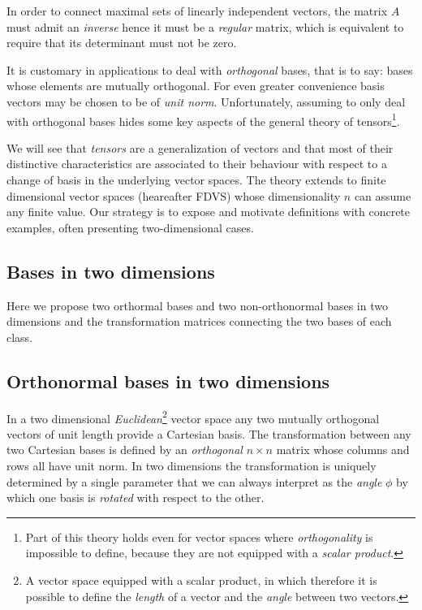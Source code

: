In order to connect maximal sets of linearly independent vectors, the matrix $A$ must admit an \textit{inverse} hence it must be a \textit{regular} matrix, which is equivalent to require that its determinant must not be zero. 

It is customary in applications to deal with \textit{orthogonal} bases, that is to say: bases whose elements are mutually orthogonal. For even greater convenience basis vectors may be chosen to be of \textit{unit norm}. 
Unfortunately, assuming to only deal with orthogonal bases hides some key aspects of the general theory of tensors\footnote{Part of this theory holds even for vector spaces where \textit{orthogonality} is impossible to define, because they are not equipped with a \textit{scalar product}.}.   

We will see that \textit{tensors} are a generalization of vectors and that most of their distinctive characteristics are associated to their behaviour with respect to a change of basis in the underlying vector spaces. The theory extends to finite dimensional vector spaces (heareafter FDVS) whose dimensionality $n$ can assume any finite value. Our strategy is to expose and motivate definitions with concrete examples, often presenting two-dimensional cases.

\subsection{Bases in two dimensions}
Here we propose two orthormal bases and two non-orthonormal bases in two dimensions and the transformation matrices connecting the two bases of each class.  

\subsection{Orthonormal bases in two dimensions}
In a two dimensional \textit{Euclidean}\footnote{A vector space equipped with a scalar product, in which therefore it is possible to define the \textit{length} of a vector and the \textit{angle} between two vectors.} vector space any two mutually orthogonal vectors of unit length provide a Cartesian basis. The transformation between any two Cartesian bases is defined by an \textit{orthogonal} $n \times n$ matrix whose columns and rows all have unit norm. In two dimensions the transformation is uniquely determined by a single parameter that we can always interpret as the \textit{angle} $\phi$ by which one basis is \textit{rotated} with respect to the other. 

